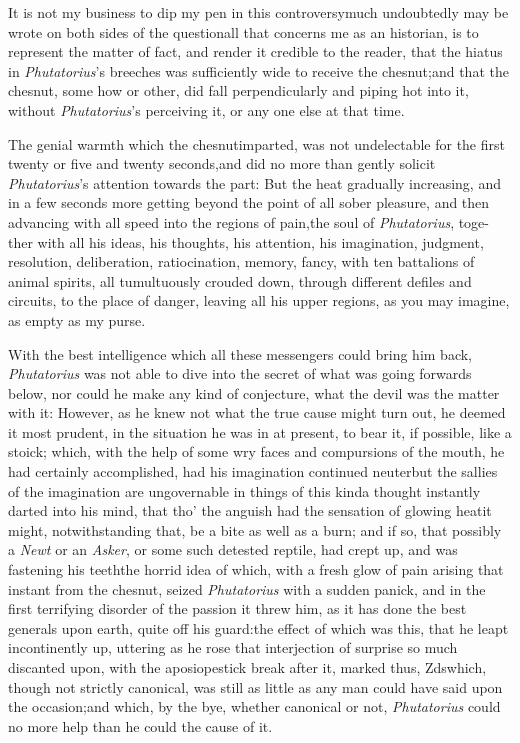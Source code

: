 \documentclass[twoside]{article}
\begin{document}
It is not my business to dip my pen in this
controversy\tsh much undoubtedly may be wrote on both
sides of the question\tsk all that concerns me as an historian,
is to represent the matter of fact, and render it credible to the
reader, that the hiatus in \textit{Phutatorius}’s breeches was
sufficiently wide to receive the ches\-nut;\break\tsh and that the
chesnut, some how or other, did fall perpendicularly and piping hot
into it, without \textit{Phutatorius}’s perceiving it, or any
one else at that time.

The genial warmth which the chesnut\break imparted, was not
undelectable for the first twenty or five and twenty
seconds,\tsk and did no more than gently solicit
\textit{Phu\-tatorius}’s attention towards the
part:\tsk\break
But the heat gradually increasing, and in a few
seconds more getting beyond the point of all sober pleasure, and
then advancing with all speed into the regions of pain,\tsk the soul of
\textit{Phutatorius}, toge- ther with all his ideas, his thoughts, his
attention, his imagination, judgment,\break
resolution, deliberation, ratiocination,\break
memory, fancy, with ten battalions of animal
spirits, all tumultuously crouded down, through different defiles
and circuits, to the place of danger, leaving all his upper
regions, as you may imagine, as empty as my purse.

With the best intelligence which all these messengers could
bring him back, \textit{Phutatorius} was not able to dive into the
secret of what was going forwards below, nor could he make any kind
of conjecture, what the devil was the matter with it: However, as
he knew not what the true cause might turn out, he deemed it most
prudent, in the situation he was in at present, to bear it,
if possible, like a stoick;
which, with the help of some
wry faces and compursions of the
mouth, he had certainly accomplished, had his imagination continued
neuter\tsh but the sallies of the imagination are
ungovernable in things of this kind\tsk a thought instantly
darted into his mind, that tho’ the anguish had the sensation
of glowing heat\tsk it might, notwithstanding that, be a bite as
well as a burn; and if so, that possibly a \textit{Newt} or an
\textit{Asker}, or some such detested reptile, had crept up, and was
fastening his teeth\tsh the horrid idea of which, with a
fresh glow of pain arising that instant from the chesnut, seized
\textit{Phutatorius} with a sudden panick, and in the first
terrifying disorder of the passion it threw him, as it has done
the best generals upon earth, quite off his guard:\tsk the
effect of which was this, that he leapt incontinently up, uttering
as he rose that interjection of surprise so much discanted upon,
with the apo\-sio\-pestick break after it, marked thus,\break
Z\tsh ds\tsk which, though not strictly canonical, was still as little as any man
could have said upon the occasion;\tsh\break and which,
by the bye, whether canonical or not, \textit{Phutatorius} could no
more help than he could the cause of it.
\end{document}
